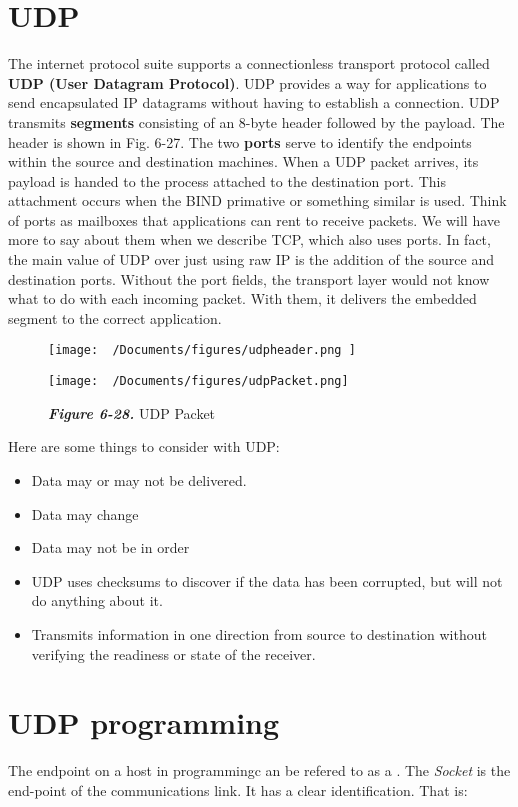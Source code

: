 \documentclass{report}
\begin{document}
\section{UDP}
The internet protocol suite supports a connectionless transport protocol called \textbf{UDP (User Datagram Protocol)}. UDP provides a way for applications to send encapsulated IP datagrams without having to establish a connection.
\bigbreak \noindent
UDP transmits \textbf{segments} consisting of an 8-byte header followed by the payload. The header is shown in Fig. 6-27. The two \textbf{ports} serve to identify the endpoints within the source and destination machines. When a UDP packet arrives, its payload is handed to the process attached to the destination port. This attachment occurs when the BIND primative or something similar is used.
\bigbreak \noindent
Think of ports as mailboxes that applications can rent to receive packets. We will have more to say about them when we describe TCP, which also uses ports. In fact, the main value of UDP over just using raw IP is the addition of the source and destination ports. Without the port fields, the transport layer would not know what to do with each incoming packet. With them, it delivers the embedded segment to the correct application.
\bigbreak \noindent
\begin{figure}[H]
\centering
\texttt{[image:  ~/Documents/figures/udpheader.png ]}
\end{figure}
\newpage
\begin{figure}[H]
\centering
\texttt{[image:   ~/Documents/figures/udpPacket.png]}
\caption*{\small{\textbf{\textit{Figure 6-28.}} UDP Packet}}
\end{figure}
\noindent Here are some things to consider with UDP:
\begin{itemize}
  \item Data may or may not be delivered.
  \item Data may change
  \item Data may not be in order
  \item UDP uses checksums to discover if the data has been corrupted, but will not do anything about it.
  \item Transmits information in one direction from source to destination without verifying the readiness or state of the receiver.
\end{itemize}
\section{UDP programming}
The endpoint on a host in programmingc an be refered to as a .
\bigbreak \noindent
The \textit{Socket} is the end-point of the communications link. It has a clear identification. That is: \vspace{2mm}
\end{document}
